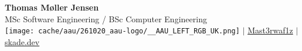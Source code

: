 \huge\textbf{Thomas Møller Jensen} \\
\tiny MSc Software Engineering / BSc Computer Engineering \\
\texttt{[image: cache/aau/261020\_aau-logo/\_\_AAU\_LEFT\_RGB\_UK.png]}
\normalsize $\mid$
\small\faGithub\hspace{4pt}\href{https://github.com/Mast3rwaf1z}{Mast3rwaf1z}
\normalsize $\mid$
\faHome\hspace{4pt}\href{https://skade.dev}{skade.dev}
